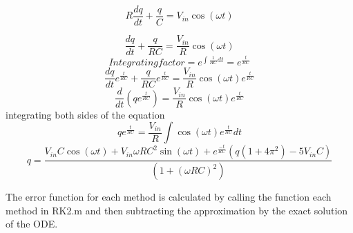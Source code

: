 \documentclass[11pt, oneside, titlepage]{article}   	%
\begin{document}
\[R\frac{dq}{dt}+\frac{q}{C}=V_{in}\cos(\omega t) \]

\[\frac{dq}{dt}+\frac{q}{RC}=\frac{V_{in}}{R}\cos(\omega t) \]
\[Integrating factor =e^{\int\frac{1}{RC} dt} = e^{\frac{t}{RC}}\]
\[\frac{dq}{dt}e^{\frac{t}{RC}}+\frac{q}{RC}e^{\frac{t}{RC}}=\frac{V_{in}}{R}\cos(\omega t)e^{\frac{t}{RC}}\]
\[\frac{d}{dt}(qe^{\frac{t}{RC}})=\frac{V_{in}}{R}\cos(\omega t)e^{\frac{t}{RC}}\]
integrating both sides of the equation
\[qe^{\frac{t}{RC}}=\frac{V_{in}}{R}\int\cos(\omega t)e^{\frac{t}{RC}}dt\]
\[q=\frac{V_{in}C\cos(\omega t)+V_{in}\omega RC^2\sin(\omega t)+e^{\frac{-t}{RC}}(q(1+4\pi^2)-5V_{in}C)}{(1+(\omega RC)^2)}\]

The error function for each method is calculated by calling the function each method in RK2.m and then subtracting the approximation by the exact solution of the ODE.
\end{document}
